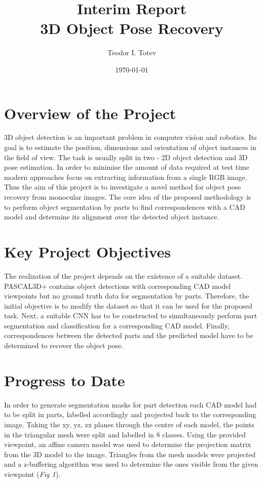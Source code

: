 \documentclass[11pt,a4paper]{article}
\title{Interim Report \\ 3D Object Pose Recovery}
\author{Teodor I. Totev}
\date{\today}
\begin{document}
\maketitle

\section{Overview of the Project} 
3D object detection is an important problem in computer vision and robotics. Its goal is to estimate the position, dimensions and orientation of object instances in the field of view. The task is usually split in two - 2D object detection and 3D pose estimation. In order to minimise the amount of data required at test time modern approaches focus on extracting information from a single RGB image. Thus the aim of this project is to investigate a novel method for object pose recovery from monocular images. The core idea of the proposed methodology is to perform object segmentation by parts to find correspondences with a CAD model and determine its alignment over the detected object instance.

\section{Key Project Objectives}
The realization of the project depends on the existence of a suitable dataset. PASCAL3D+ contains object detections with corresponding CAD model viewpoints but no ground truth data for segmentation by parts. Therefore, the initial objective is to modify the dataset so that it can be used for the proposed task. Next, a suitable CNN has to be constructed to simultaneously perform part segmentation and classification for a corresponding CAD model. Finally, correspondences between the detected parts and the predicted model have to be determined to recover the object pose.

\section{Progress to Date}
In order to generate segmentation masks for part detection each CAD model had to be split in parts, labelled accordingly and projected back to the corresponding image. Taking the xy, yz, zx planes through the centre of each model, the points in the triangular mesh were split and labelled in 8 classes. Using the provided viewpoint, an affine camera model was used to determine the projection matrix from the 3D model to the image. Triangles from the mesh models were projected and a z-buffering algorithm was used to determine the ones visible from the given viewpoint (\emph{Fig 1}).
\end{document}
